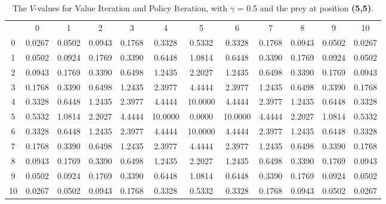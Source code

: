 \documentclass{article}
\begin{document}
\subsection*{}
\begin{table}[htb]
\centering 
 \begin{footnotesize}  
\begin{tabular} {c c c c c c c c c c c c}
 & 0 & 1 & 2 & 3 & 4 & 5 & 6 & 7 & 8 & 9 & 10 \\
 0 & 0.0267 &  0.0502 &  0.0943 &  0.1768 &  0.3328 &  0.5332 &  0.3328 &  0.1768 &  0.0943 &  0.0502 &  0.0267\\
1 & 0.0502 &  0.0924 &  0.1769 &  0.3390 &  0.6448 &  1.0814 &  0.6448 &  0.3390 &  0.1769 &  0.0924 &  0.0502\\
2 & 0.0943 &  0.1769 &  0.3390 &  0.6498 &  1.2435 &  2.2027 &  1.2435 &  0.6498 &  0.3390 &  0.1769 &  0.0943\\
3 & 0.1768 &  0.3390 &  0.6498 &  1.2435 &  2.3977 &  4.4444 &  2.3977 &  1.2435 &  0.6498 &  0.3390 &  0.1768\\
4 & 0.3328 &  0.6448 &  1.2435 &  2.3977 &  4.4444 & 10.0000 &  4.4444 &  2.3977 &  1.2435 &  0.6448 &  0.3328\\
5 & 0.5332 &  1.0814 &  2.2027 &  4.4444 & 10.0000 &  0.0000 & 10.0000 &  4.4444 &  2.2027 &  1.0814 &  0.5332\\
6 & 0.3328 &  0.6448 &  1.2435 &  2.3977 &  4.4444 & 10.0000 &  4.4444 &  2.3977 &  1.2435 &  0.6448 &  0.3328\\
7 & 0.1768 &  0.3390 &  0.6498 &  1.2435 &  2.3977 &  4.4444 &  2.3977 &  1.2435 &  0.6498 &  0.3390 &  0.1768\\
8 & 0.0943 &  0.1769 &  0.3390 &  0.6498 &  1.2435 &  2.2027 &  1.2435 &  0.6498 &  0.3390 &  0.1769 &  0.0943\\
9 & 0.0502 &  0.0924 &  0.1769 &  0.3390 &  0.6448 &  1.0814 &  0.6448 &  0.3390 &  0.1769 &  0.0924 &  0.0502\\
10 & 0.0267 &  0.0502 &  0.0943 &  0.1768 &  0.3328 &  0.5332 &  0.3328 &  0.1768 &  0.0943 &  0.0502 &  0.0267\\
\end{tabular}\\
\end{footnotesize}
\caption{The $V$-values for Value Iteration and Policy Iteration, with $\gamma$ = 0.5 and the prey at position \textbf{(5,5)}. }
\label{valueiteration2}
\end{table}
\end{document}

